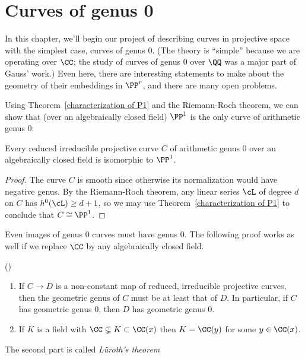 

\chapter{Curves of genus 0 }\label{genus 0 chapter}\label{3a}

In this chapter, we'll begin our project of describing curves in projective space with the simplest case, curves of genus 0. (The theory is ``simple'' because we are operating over $\CC$; the study of curves of genus 0 over $\QQ$ was a major part of Gauss' work.) Even here, there are interesting statements to make about the geometry of their embeddings in $\PP^r$, and there are many open problems.
 

Using Theorem~\ref{characterization of P1} and the Riemann-Roch theorem, we can show that (over an algebraically closed field) $\PP^1$
is the only curve of arithmetic genus 0:

\begin{corollary}
 Every reduced irreducible projective curve $C$ of arithmetic genus 0 over an algebraically closed field is isomorphic to $\PP^1$.
 \end{corollary}

\begin{proof}
The curve $C$ is smooth since otherwise its normalization would have negative genus.
By the Riemann-Roch theorem, any linear series $\cL$ of degree $d$ on $C$ has $h^0(\cL) \geq d+1$, so we may use Theorem~\ref{characterization of P1}
to conclude that $C\cong \PP^1$.
\end{proof}

Even images of genus 0 curves must have genus 0. The following proof works as well if we replace $\CC$ by any algebraically
closed field.

\begin{theorem}(\cite{Luroth})\label{Lueroth}
\begin{enumerate}
\item If $C\to D$ is a non-constant map of reduced, irreducible projective curves, then the geometric genus of $C$ must be at least that of $D$.
In particular, if $C$ has geometric genus 0,  
then $D$ has geometric genus 0.
 \item If $K$ is a field with $\CC \subsetneq K \subset \CC(x)$
  then $K = \CC(y)$ for some $y \in \CC(x)$. 
\end{enumerate}
\end{theorem}


The second part is called \emph{L\"uroth's theorem}
 
